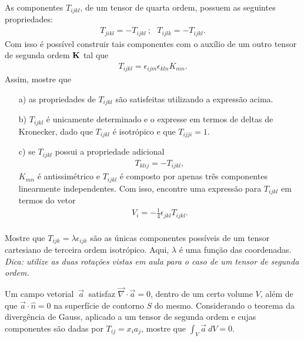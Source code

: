 \documentclass[a4paper,12pt]{article}
\begin{document}
%
\newpage
{}

\indent \par As componentes $T_{ijkl}$, de um tensor de quarta ordem, possuem as seguintes propriedades:
%
\begin{eqnarray}
  \nonumber
  T_{jikl}=-T_{ijkl} ~;~~~ T_{ijlk}=-T_{ijkl}.
 \end{eqnarray}
%
\noindent Com isso é possível construir tais componentes com o auxílio de um outro tensor de segunda ordem ${\bf{K}}$ tal que
%
\begin{eqnarray}
  \nonumber
  T_{ijkl}=\epsilon_{ijm} \epsilon_{kln}K_{mn}.
 \end{eqnarray}
%
\noindent Assim, mostre que 
%
\begin{itemize}
 \item[a)] as propriedades de $T_{ijkl}$ são satisfeitas utilizando a expressão acima.
 \item[b)] $T_{ijkl}$ é unicamente determinado e o expresse em termos de deltas de Kronecker, dado que $T_{ijkl}$ é isotrópico e que $T_{ijji}=1$.
 \item[c)] se $T_{ijkl}$ possui a propriedade adicional
\begin{eqnarray}
  \nonumber
  T_{klij}=-T_{ijkl},
 \end{eqnarray}
%
\noindent $K_{mn}$ é antissimétrico e $T_{ijkl}$ é composto por apenas três componentes linearmente independentes. Com isso, encontre uma expressão para $T_{ijkl}$ em termos do vetor
%
\begin{eqnarray}
  \nonumber
  V_{i}=-\frac{1}{4}\epsilon_{jkl}T_{ijkl}.\\
  \nonumber
 \end{eqnarray}
%
\end{itemize}
%



\indent \par Mostre que $T_{ijk}=\lambda \epsilon_{ijk}$ são as únicas componentes possíveis de um tensor cartesiano de terceira ordem isotrópico. Aqui, $\lambda$ é uma função das coordenadas. {\it{Dica: utilize as duas rotações vistas em aula para o caso de um tensor de segunda ordem.}}\\
%


\indent \par Um campo vetorial $~\vec{a}~$ satisfaz $\vec{\nabla}\cdot \vec{a}=0$, dentro de um certo volume $V$, além de que $\vec{a}\cdot \hat{n}=0$ na superfície de contorno $S$ do mesmo. Considerando o teorema da divergência de Gauss, aplicado a um tensor de segunda ordem e cujas componentes são dadas por $T_{ij}=x_{i}a_{j}$, mostre que $\int_{V} \vec{a} ~dV=0$.
\end{document}
